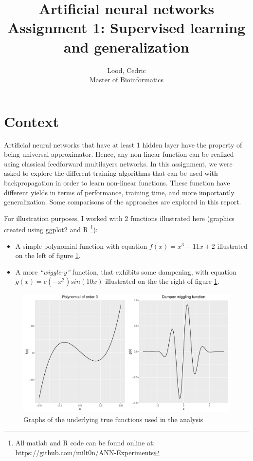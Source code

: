 \documentclass[11pt, a4paper]{article}
\title{ \huge Artificial neural networks \\ 
  { \large Assignment 1: Supervised learning and generalization }}
\author{
        Lood, Cedric \\
        \small Master of Bioinformatics
}
\begin{document}
\maketitle

\section{Context}

Artificial neural networks that have at least 1 hidden layer have the
property of being universal
approximator\cite{hornik1989multilayer,leshno1993multilayer}. Hence,
any non-linear function can be realized using classical feedforward
multilayers networks. In this assignment, we were asked to explore the
different training algorithms that can be used with backpropagation in
order to learn non-linear functions. These function have different
yields in terms of performance, training time, and more importantly
generalization. Some comparisons of the approaches are explored in
this report.

\noindent For illustration purposes, I worked with 2 functions
illustrated here (graphics created using ggplot2 and R \footnote{All
  matlab and R code can be found online at:
  https://github.com/milt0n/ANN-Experiments}):

\begin{itemize}
\item A simple polynomial function with equation $f(x)=x^3-11x+2$
  illustrated on the left of figure \ref{fig:functions}.
\item A more \emph{``wiggle-y''} function, that exhibits some
  dampening, with equation $g(x)=e(-x^2)sin(10x)$ illustrated on the
  the right of figure \ref{fig:functions}.
\end{itemize}

\begin{figure}[H]
    \centering
    \includegraphics[scale=.50]{true_functions.pdf}
    \caption{Graphs of the underlying true functions used in the analysis}
    \label{fig:functions}
\end{figure}
\end{document}
